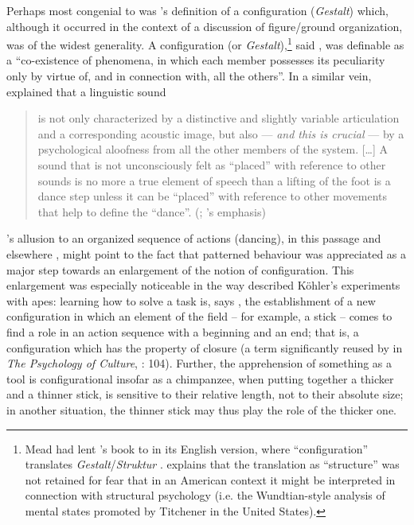 \documentclass[output=paper]{langscibook}
\begin{document}
Perhaps most congenial to {\Sapir} was {\Koffka}'s definition of a configuration (\emph{Ge\-stalt}) which, although it occurred in the context of a discussion of figure/ground organization, was of the widest generality. A configuration (or \emph{Gestalt}),\footnote{Mead had lent {\Koffka}'s book to {\Sapir} in its English version, where ``configuration'' translates \emph{Gestalt}/\emph{Struktur} \citep[185]{Darnell1990}. {\Koffka} explains that the translation as ``structure'' was not retained for fear that in an American context it might be interpreted in connection with structural psychology (i.e. the Wundtian-style analysis of mental states promoted by Titchener in the United States).} said \citet[146]{Koffka1924}, was definable as a ``co-existence of phenomena, in which each member possesses its peculiarity only by virtue of, and in connection with, all the others''. In a similar vein, {\Sapir} explained that a linguistic sound 

\begin{quotation}
is not only characterized by a distinctive and slightly variable articulation and a corresponding acoustic image, but also — \emph{and this is crucial} — by a psychological aloofness from all the other members of the system. […] A sound that is not unconsciously felt as ``placed'' with reference to other sounds is no more a true element of speech than a lifting of the foot is a dance step unless it can be ``placed'' with reference to other movements that help to define the ``dance''. (\citealt[35]{Sapir1925}; {\Sapir}'s emphasis)
\end{quotation}

{\Sapir}'s allusion to an organized sequence of actions (dancing), in this passage and elsewhere \citep[104--105]{Sapir2002}, might point to the fact that patterned behaviour was appreciated as a major step towards an enlargement of the notion of configuration. This enlargement was especially noticeable in the way {\Koffka} described Köhler's experiments with apes: learning how to solve a task is, says {\Koffka}, the establishment of a new configuration in which an element of the field -- for example, a stick -- comes to find a role in an action sequence with a beginning and an end; that is, a configuration which has the property of closure (a term significantly reused by {\Sapir} in \emph{The Psychology of Culture}, \citeyear{Sapir2002}: 104). Further, the apprehension of something as a tool is configurational insofar as a chimpanzee, when putting together a thicker and a thinner stick, is sensitive to their relative length, not to their absolute size; in another situation, the thinner stick may thus play the role of the thicker one.
\end{document}
